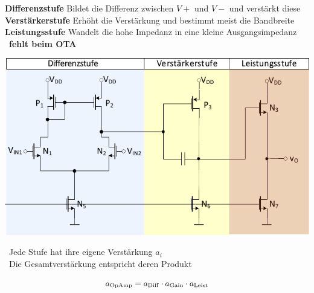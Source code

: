 \begin{outline}
    \1 \textbf{Differenzstufe}
        \2 Bildet die Differenz zwischen $V+$ und $V-$ und verstärkt diese
    \1 \textbf{Verstärkerstufe}
        \2 Erhöht die Verstärkung und bestimmt meist die Bandbreite
    \1 \textbf{Leistungsstufe}
        \2 Wandelt die hohe Impedanz in eine kleine Ausgangsimpedanz
            \textrightarrow\ \textbf{fehlt beim OTA}
\end{outline}





\vspace{-0.2cm}

\begin{center}
    \includegraphics[width=0.8\columnwidth, align=t]{images/09_OpAmp_teile.pdf}
\end{center}

\vspace{-0.3cm}

\begin{minipage}[c]{0.58\columnwidth}
    \textrightarrow\ Jede Stufe hat ihre eigene Verstärkung $a_i$ \\
    \textrightarrow\ Die Gesamtverstärkung entspricht deren Produkt
\end{minipage}
\hfill
\begin{minipage}[b]{0.4\columnwidth}
    $$ a_{\rm OpAmp} = a_{\rm Diff} \cdot a_{\rm Gain} \cdot a_{\rm Leist} $$
\end{minipage}


